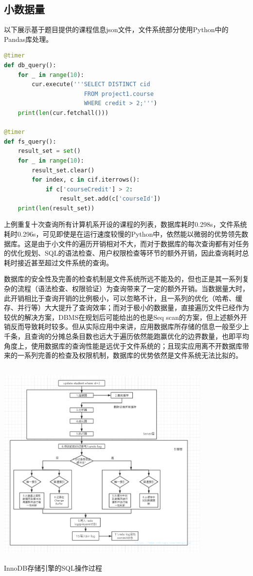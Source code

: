 \subsection{小数据量}
以下展示基于题目提供的课程信息json文件，文件系统部分使用Python中的Pandas库处理。
\begin{lstlisting}[language=python]
@timer
def db_query():
    for _ in range(10):
        cur.execute('''SELECT DISTINCT cid
                       FROM project1.course
                       WHERE credit > 2;''')
    print(len(cur.fetchall()))

@timer
def fs_query():
    result_set = set()
    for _ in range(10):
        result_set.clear()
        for index, c in cif.iterrows():
            if c['courseCredit'] > 2:
                result_set.add(c['courseId'])
    print(len(result_set))
\end{lstlisting}
\vspace{-2em}
\par 上例重复十次查询所有计算机系开设的课程的列表，数据库耗时0.298s，文件系统耗时0.296s，可见即使是在运行速度较慢的Python中，依然能以微弱的优势领先数据库。这是由于小文件的遍历开销相对不大，而对于数据库的每次查询都有对任务的优化规划、SQL的语法检查、用户权限检查等环节的额外开销，因此查询耗时总耗时接近甚至超过文件系统的查询。

\par
数据库的安全性及完善的检查机制是文件系统所远不能及的，但也正是其一系列复杂的流程（语法检查、权限验证）为查询带来了一定的额外开销。当数据量大时，此开销相比于查询开销的比例极小，可以忽略不计，且一系列的优化（哈希、缓存、并行等）大大提升了查询效率；而对于极小的数据量，直接遍历文件已经作为较优的解决方案，DBMS在规划后可能给出的也是Seq scan的方案，但上述额外开销反而导致耗时较多。但从实际应用中来讲，应用数据库所存储的信息一般至少上千条，且查询的分摊总条目数也远大于遍历依然能跑赢优化的边界数量，也即平均角度上，使用数据库的查询性能是远优于文件系统的；且现实应用离不开数据库带来的一系列完善的检查及权限机制，数据库的优势依然是文件系统无法比拟的。\\~\\
\centerline{\includegraphics[width=0.8\textwidth]{pic/qry}}
\scriptsize
\centerline{InnoDB存储引擎的SQL操作过程\textsuperscript{\cite{m-2020}}}
\normalsize